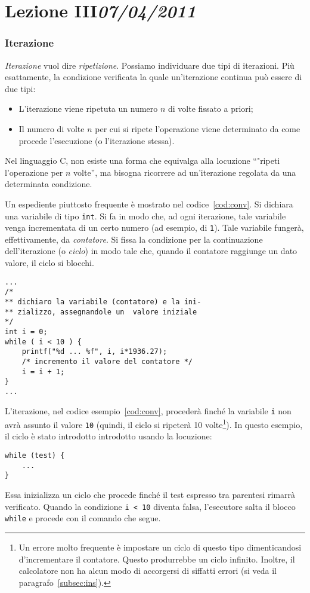 \chapter[Lezione III]{Lezione III\newline\small{\emph{07/04/2011}}}
	\subsection{Iterazione}
	\label{sec:it}

\emph{Iterazione} vuol dire \emph{ripetizione}. Possiamo individuare due tipi di iterazioni. Più esattamente, la condizione verificata la quale un'iterazione continua può essere di due tipi:
\begin{itemize}
	\item
L'iterazione viene ripetuta un numero $n$ di volte fissato a priori;
	\item
Il numero di volte $n$ per cui si ripete l'operazione viene determinato da come procede l'esecuzione (o l'iterazione stessa).
\end{itemize}	
Nel linguaggio C, non esiste una forma che equivalga alla locuzione “"ripeti l'operazione per $n$ volte'', ma bisogna ricorrere ad un'iterazione regolata da una determinata condizione.

Un espediente piuttosto frequente è mostrato nel codice~\vref{cod:conv}. Si dichiara una variabile di tipo \lstinline!int!. Si fa in modo che, ad ogni iterazione, tale variabile venga incrementata di un certo numero (ad esempio, di \lstinline!1!). Tale  variabile fungerà, effettivamente, da \emph{contatore}. Si fissa la condizione per la continuazione dell'iterazione (o \emph{ciclo}) in modo tale che, quando il contatore raggiunge un dato valore, il ciclo si blocchi.
\begin{lstlisting}[caption={{\em Tabella di conversione \euro{} - \pounds.}}, label={cod:conv}]
...
/* 
** dichiaro la variabile (contatore) e la ini-
** zializzo, assegnandole un  valore iniziale
*/
int i = 0; 
while ( i < 10 ) {
	printf("%d ... %f", i, i*1936.27);
	/* incremento il valore del contatore */
	i = i + 1; 
}
...
\end{lstlisting}
L'iterazione, nel codice esempio~\vref{cod:conv}, procederà finché la variabile \lstinline!i! non avrà assunto il valore \lstinline!10! (quindi, il ciclo si ripeterà 10 volte\footnote{Un errore molto frequente è impostare un ciclo di questo tipo dimenticandosi d'incrementare il contatore. Questo produrrebbe un ciclo infinito. Inoltre, il calcolatore non ha alcun modo di accorgersi di siffatti errori (si veda il paragrafo~\vref{subsec:ins}).}). In questo esempio, il ciclo è stato introdotto introdotto usando la locuzione:
\begin{lstlisting}
while (test) {
	...
}
\end{lstlisting}
Essa inizializza un ciclo che  procede finché il test espresso tra parentesi rimarrà verificato. Quando la condizione \lstinline!i < 10! diventa falsa, l'esecutore salta il blocco \lstinline!while! e procede con il comando che segue.

